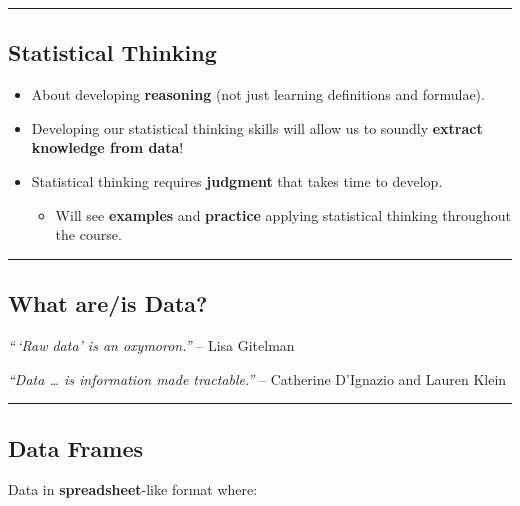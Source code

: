 \documentclass[
  letterpaper,
  DIV=11,
  numbers=noendperiod]{scrartcl}
\providecommand{\tightlist}{%
  \setlength{\itemsep}{0pt}\setlength{\parskip}{0pt}}\usepackage{longtable,booktabs,array}
\begin{document}
\begin{center}\rule{0.5\linewidth}{0.5pt}\end{center}

\hypertarget{statistical-thinking-1}{%
\subsection{Statistical Thinking}\label{statistical-thinking-1}}

\begin{itemize}
\item
  About developing \textbf{reasoning} (not just learning definitions and
  formulae).
\item
  Developing our statistical thinking skills will allow us to soundly
  \textbf{extract knowledge from data}!
\item
  Statistical thinking requires \textbf{judgment} that takes time to
  develop.

  \begin{itemize}
  \tightlist
  \item
    Will see \textbf{examples} and \textbf{practice} applying
    statistical thinking throughout the course.
  \end{itemize}
\end{itemize}

\begin{center}\rule{0.5\linewidth}{0.5pt}\end{center}

\hypertarget{what-areis-data}{%
\subsection{\texorpdfstring{{What are/is
Data?}}{What are/is Data?}}\label{what-areis-data}}

\emph{``\,`Raw data' is an oxymoron.''} -- Lisa Gitelman

\emph{``Data \ldots{} is information made tractable.''} -- Catherine
D'Ignazio and Lauren Klein

\begin{center}\rule{0.5\linewidth}{0.5pt}\end{center}

\hypertarget{data-frames}{%
\subsection{Data Frames}\label{data-frames}}

Data in \textbf{spreadsheet}-like format where:
\end{document}
